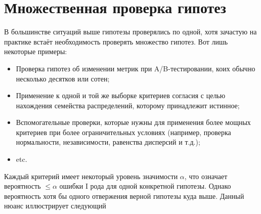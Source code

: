 \section{Множественная проверка гипотез}

В большинстве ситуаций выше гипотезы проверялись по одной, хотя зачастую на практике встаёт необходимость проверять множество гипотез. Вот лишь некоторые примеры:
\begin{itemize}
    \item Проверка гипотез об изменении метрик при A/B-тестировании, коих обычно несколько десятков или сотен;
    \item Применение к одной и той же выборке критериев согласия с целью нахождения семейства распределений, которому принадлежит истинное;
    \item Вспомогательные проверки, которые нужны для применения более мощных критериев при более ограничительных условиях (например, проверка нормальности, независимости, равенства дисперсий и т.д.);
    \item etc.
\end{itemize}
Каждый критерий имеет некоторый уровень значимости $\alpha$, что означает вероятность $\le \alpha$ ошибки I рода для одной конкретной гипотезы. Однако вероятность хотя бы одного отвержения верной гипотезы куда выше. Данный нюанс иллюстрирует следующий

